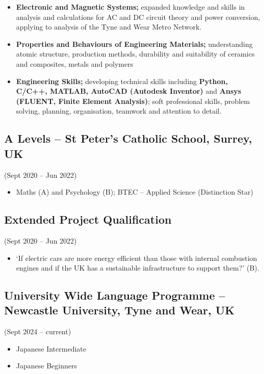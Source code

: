 \documentclass[../main.tex]{subfiles}
\begin{document}
\begin{itemize}
        \item \textbf{Electronic and Magnetic Systems;} expanded knowledge and skills in analysis and calculations for AC and DC circuit theory and power conversion, applying to analysis of the Tyne and Wear Metro Network.
        \item \textbf{Properties and Behaviours of Engineering Materials;} understanding atomic structure, production methods, durability and suitability of ceramics and composites, metals and polymers
        
        \item \textbf{Engineering Skills;} developing technical skills including \textbf{Python, C/C++, MATLAB, AutoCAD (Autodesk Inventor)} and \textbf {Ansys (FLUENT, Finite Element Analysis)}; soft professional skills, problem solving, planning, organisation, teamwork and attention to detail.
    \end{itemize}
    
    \subsection*{A Levels – St Peter’s Catholic School, Surrey, UK}(Sept 2020 – Jun 2022) 
    \begin{itemize}
        \item Maths (A) and Psychology (B); BTEC -- Applied Science (Distinction Star)
    \end{itemize}
    \noindent
    \subsection*{Extended Project Qualification}(Sept 2020 – Jun 2022)
    \begin{itemize}
        \item ‘If electric cars are more energy efficient than those with internal combustion engines and if the UK has a sustainable infrastructure to support them?’ (B).
    \end{itemize}
        \subsection*{University Wide Language Programme – Newcastle University, Tyne and Wear, UK}(Sept 2024 – current)
        \begin{itemize}
            \item Japanese Intermediate
            \item Japanese Beginners
        \end{itemize}
\end{document}
